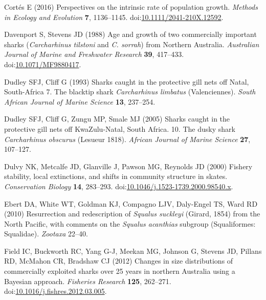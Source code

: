 \documentclass[]{article}
\begin{document}
\leavevmode\hypertarget{ref-cortes_perspectives_2016}{}%
Cortés E (2016) Perspectives on the intrinsic rate of population growth.
\emph{Methods in Ecology and Evolution} \textbf{7}, 1136--1145.
doi:\href{https://doi.org/10.1111/2041-210X.12592}{10.1111/2041-210X.12592}.

\leavevmode\hypertarget{ref-davenport_age_1988}{}%
Davenport S, Stevens JD (1988) Age and growth of two commercially
important sharks (\emph{Carcharhinus tilstoni} and \emph{C. sorrah})
from Northern Australia. \emph{Australian Journal of Marine and
Freshwater Research} \textbf{39}, 417--433.
doi:\href{https://doi.org/10.1071/MF9880417}{10.1071/MF9880417}.

\leavevmode\hypertarget{ref-dudley_sharks_1993}{}%
Dudley SFJ, Cliff G (1993) Sharks caught in the protective gill nets off
Natal, South-Africa 7. The blacktip shark \emph{Carcharhinus limbatus}
(Valenciennes). \emph{South African Journal of Marine Science}
\textbf{13}, 237--254.

\leavevmode\hypertarget{ref-dudley_sharks_2005}{}%
Dudley SFJ, Cliff G, Zungu MP, Smale MJ (2005) Sharks caught in the
protective gill nets off KwaZulu-Natal, South Africa. 10. The dusky
shark \emph{Carcharhinus obscurus} (Lesueur 1818). \emph{African Journal
of Marine Science} \textbf{27}, 107--127.

\leavevmode\hypertarget{ref-dulvy_fishery_2000}{}%
Dulvy NK, Metcalfe JD, Glanville J, Pawson MG, Reynolds JD (2000)
Fishery stability, local extinctions, and shifts in community structure
in skates. \emph{Conservation Biology} \textbf{14}, 283--293.
doi:\href{https://doi.org/10.1046/j.1523-1739.2000.98540.x}{10.1046/j.1523-1739.2000.98540.x}.

\leavevmode\hypertarget{ref-ebert_resurrection_2010}{}%
Ebert DA, White WT, Goldman KJ, Compagno LJV, Daly-Engel TS, Ward RD
(2010) Resurrection and redescription of \emph{Squalus suckleyi}
(Girard, 1854) from the North Pacific, with comments on the
\emph{Squalus acanthias} subgroup (Squaliformes: Squalidae).
\emph{Zootaxa} 22--40.

\leavevmode\hypertarget{ref-field_changes_2012}{}%
Field IC, Buckworth RC, Yang G-J, Meekan MG, Johnson G, Stevens JD,
Pillans RD, McMahon CR, Bradshaw CJ (2012) Changes in size distributions
of commercially exploited sharks over 25 years in northern Australia
using a Bayesian approach. \emph{Fisheries Research} \textbf{125},
262--271.
doi:\href{https://doi.org/10.1016/j.fishres.2012.03.005}{10.1016/j.fishres.2012.03.005}.
\end{document}
